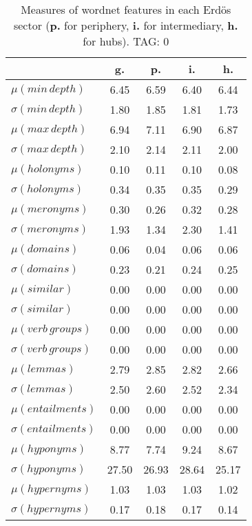 \begin{table}[h!]
\begin{center}
\begin{tabular}{| l || c | c | c | c |}\hline
 & {\bf g.} & {\bf p.} & {\bf i.} & {\bf h.} \\\hline\hline
$\mu(min\,depth)$ & 6.45  & 6.59  & 6.40  & 6.44 \\
$\sigma(min\,depth)$ & 1.80  & 1.85  & 1.81  & 1.73 \\\hline
$\mu(max\,depth)$ & 6.94  & 7.11  & 6.90  & 6.87 \\
$\sigma(max\,depth)$ & 2.10  & 2.14  & 2.11  & 2.00 \\\hline
$\mu(holonyms)$ & 0.10  & 0.11  & 0.10  & 0.08 \\
$\sigma(holonyms)$ & 0.34  & 0.35  & 0.35  & 0.29 \\\hline
$\mu(meronyms)$ & 0.30  & 0.26  & 0.32  & 0.28 \\
$\sigma(meronyms)$ & 1.93  & 1.34  & 2.30  & 1.41 \\\hline
$\mu(domains)$ & 0.06  & 0.04  & 0.06  & 0.06 \\
$\sigma(domains)$ & 0.23  & 0.21  & 0.24  & 0.25 \\\hline
$\mu(similar)$ & 0.00  & 0.00  & 0.00  & 0.00 \\
$\sigma(similar)$ & 0.00  & 0.00  & 0.00  & 0.00 \\\hline
$\mu(verb\,groups)$ & 0.00  & 0.00  & 0.00  & 0.00 \\
$\sigma(verb\,groups)$ & 0.00  & 0.00  & 0.00  & 0.00 \\\hline
$\mu(lemmas)$ & 2.79  & 2.85  & 2.82  & 2.66 \\
$\sigma(lemmas)$ & 2.50  & 2.60  & 2.52  & 2.34 \\\hline
$\mu(entailments)$ & 0.00  & 0.00  & 0.00  & 0.00 \\
$\sigma(entailments)$ & 0.00  & 0.00  & 0.00  & 0.00 \\\hline
$\mu(hyponyms)$ & 8.77  & 7.74  & 9.24  & 8.67 \\
$\sigma(hyponyms)$ & 27.50  & 26.93  & 28.64  & 25.17 \\\hline
$\mu(hypernyms)$ & 1.03  & 1.03  & 1.03  & 1.02 \\
$\sigma(hypernyms)$ & 0.17  & 0.18  & 0.17  & 0.14 \\\hline
\end{tabular}
\caption{Measures of wordnet features in each Erd\"os sector ({{\bf p.}} for periphery, {{\bf i.}} for intermediary, {{\bf h.}} for hubs). TAG: 0}
\end{center}
\end{table}